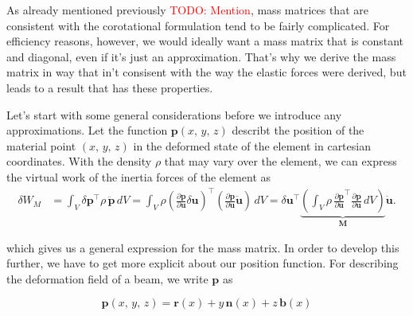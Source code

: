 As already mentioned previously \textcolor{red}{TODO: Mention}, mass matrices that are consistent with the corotational formulation tend to be fairly complicated.
For efficiency reasons, however, we would ideally want a mass matrix that is constant and diagonal, even if it's just an approximation.
That's why we derive the mass matrix in way that in't consisent with the way the elastic forces were derived, but leads to a result that has these properties.

Let's start with some general considerations before we introduce any approximations.
Let the function $\boldsymbol{p}(x,\,y,\,z)$ describt the position of the material point $(x,\,y,\,z)$ in the deformed state of the element in cartesian coordinates.
With the density $\rho$ that may vary over the element, we can express the virtual work of the inertia forces of the element as
%
\begin{align}
\delta W_{M} &= \int_{V} \delta\boldsymbol{p}^\intercal\rho\,\ddot{\boldsymbol{p}}\,dV = \int_{V} \rho\left(\frac{\partial\boldsymbol{p}}{\partial\boldsymbol{u}}\delta\boldsymbol{u}\right)^\intercal\left(\frac{\partial\boldsymbol{p}}{\partial\boldsymbol{u}}\ddot{\boldsymbol{u}}\right)\,dV = \delta\boldsymbol{u}^\intercal\underbrace{\left(\int_{V} \rho\,\frac{\partial\boldsymbol{p}}{\partial\boldsymbol{u}}^\intercal\frac{\partial\boldsymbol{p}}{\partial\boldsymbol{u}}\,dV\right)}_{\boldsymbol{M}}\ddot{\boldsymbol{u}}.
\end{align}

which gives us a general expression for the mass matrix.
In order to develop this further, we have to get more explicit about our position function.
For describing the deformation field of a beam, we write $\boldsymbol{p}$ as

\begin{equation}
\boldsymbol{p}(x,\,y,\,z) = \boldsymbol{r}(x) + y\,\boldsymbol{n}(x) + z\,\boldsymbol{b}(x)
\end{equation}

